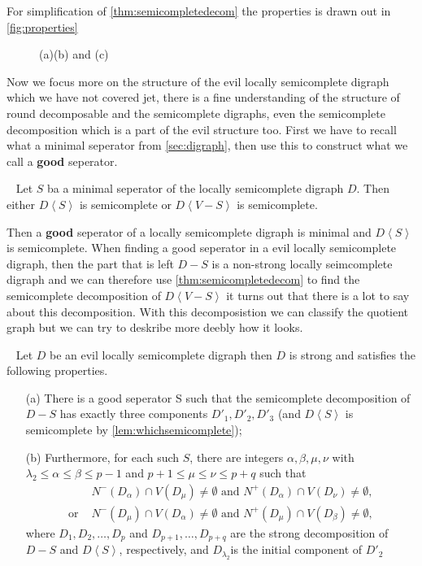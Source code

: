 For simplification of \autoref{thm:semicompletedecom} the properties is drawn out in \autoref{fig:properties}
\begin{figure}
    \caption{(a)(b) and (c)}
    \label{fig:properties}
\end{figure}
Now we focus more on the structure of the evil locally semicomplete digraph which we have not covered jet, there is a fine understanding of the structure of round decomposable and the semicomplete digraphs, even the semicomplete decomposition which is a part of the evil structure too.
First we have to recall what a minimal seperator from \autoref{sec:digraph}, then use this to construct what we call a \textbf{good} seperator.
\begin{lemma}~\cite{bangJGT85}
    Let $S$ ba a minimal seperator of the locally semicomplete digraph $D$. Then either $D\left< S\right>$ is semicomplete or $D\left< V-S\right>$ is semicomplete.
    \label{lem:whichsemicomplete}
\end{lemma}
Then a \textbf{good} seperator of a locally semicomplete digraph is minimal and $D\left<S\right>$ is semicomplete.
When finding a good seperator in a evil locally semicomplete digraph, then the part that is left $D-S$ is a non-strong locally seimcomplete digraph and we can therefore use \autoref{thm:semicompletedecom} to find the semicomplete decomposition of $D\left<V-S\right>$ it turns out that there is a lot to say about this decomposition. 
With this decomposistion we can classify the quotient graph but we can try to deskribe more deebly how it looks.
\begin{thm}~\cite{bangJGT85,bangJCT102}
    Let $D$ be an evil locally semicomplete digraph then $D$ is strong and satisfies the following properties.
    \begin{itemize}
        \item[(a)]There is a good seperator S such that the semicomplete decomposition of $D-S$ has exactly three components $D'_1,D'_2,D'_3$ (and $D\left<S\right>$ is semicomplete by \autoref{lem:whichsemicomplete});
        \item[(b)] Furthermore, for each such $S$, there are integers $\alpha, \beta,\mu,\nu$ with $\lambda_2\leq \alpha \leq \beta \leq p-1$ and $p+1\leq \mu \leq \nu \leq p+q$ such that 
        \begin{align}
            &N^-(D_\alpha)\cap V(D_\mu)\neq \emptyset \text{ and } N^+(D_\alpha)\cap V(D_\nu)\neq \emptyset,\\
            \text{or } &N^-(D_\mu)\cap V(D_\alpha)\neq \emptyset \text{ and } N^+(D_\mu)\cap V(D_\beta)\neq \emptyset,
        \end{align} 
        where $D_1,D_2,\dots, D_p$ and $D_{p+1},\dots,D_{p+q}$ are the strong decomposition of $D-S$ and $D\left< S\right>$, respectively, and $D_{\lambda_2}$is the initial component of $D'_2$ 
    \end{itemize}
    \label{thm:evildecom}
\end{thm}
